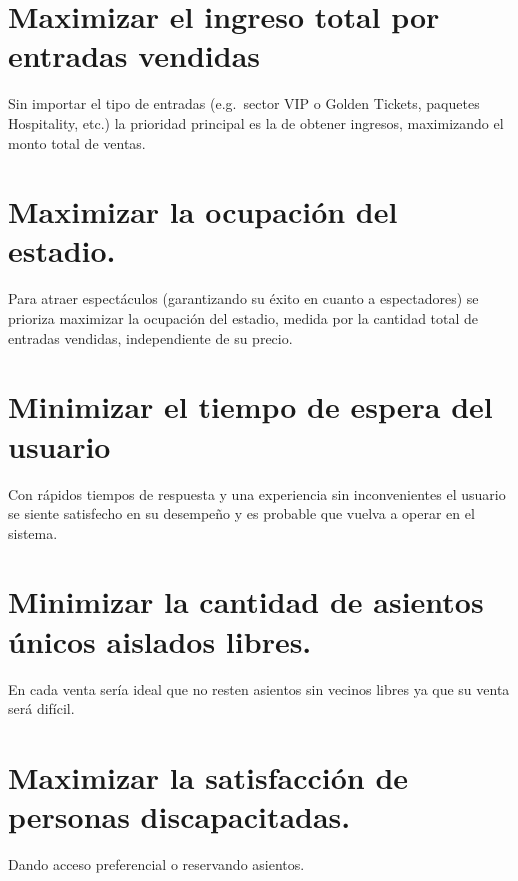 

\section{Maximizar el ingreso total por entradas vendidas}
Sin importar el tipo de entradas (e.g.\ sector VIP o Golden Tickets, paquetes
Hospitality, etc.) la prioridad principal es la de obtener ingresos, maximizando
el monto total de ventas.

\section{Maximizar la ocupación del estadio.}
Para atraer espectáculos (garantizando su éxito en cuanto a espectadores) se
prioriza maximizar la ocupación del estadio, medida por la cantidad total de entradas vendidas,
independiente de su precio.

\section{Minimizar el tiempo de espera del usuario}

Con rápidos tiempos de respuesta y una experiencia sin inconvenientes el usuario
se siente satisfecho en su desempeño y es probable que vuelva a operar en el
sistema.


\section{Minimizar la cantidad de asientos únicos aislados libres.}\label{asientos-aislados}

En cada venta sería ideal que no resten asientos sin vecinos libres ya que su venta será difícil.

\begin{figure}
\end{figure}

\section{Maximizar la satisfacción de personas discapacitadas.}
Dando acceso preferencial o reservando asientos.

